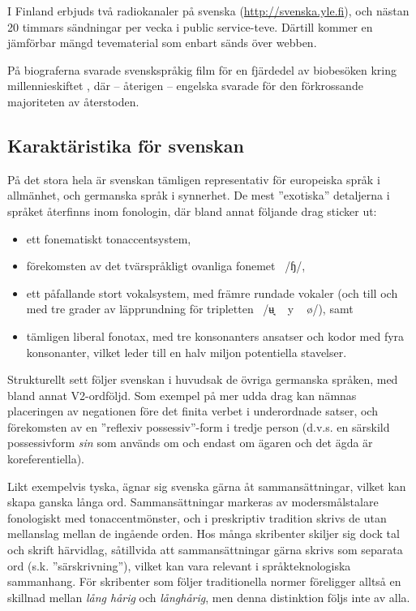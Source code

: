 \begin{multicols}{2}
I Finland erbjuds två radiokanaler på svenska
(\url{http://svenska.yle.fi}), och nästan 20 timmars sändningar per
vecka i public service-teve. Därtill kommer en jämförbar mängd
tevematerial som enbart sänds över webben.

På biograferna svarade svenskspråkig film för en fjärdedel av
biobesöken kring millennieskiftet \cite[85]{falk2001}, där -- återigen
-- engelska svarade för den förkrossande majoriteten av återstoden.


\subsection{Karaktäristika för svenskan}

På det stora hela är svenskan tämligen representativ för europeiska
språk i allmänhet, och germanska språk i synnerhet. De mest ''exotiska''
detaljerna i språket återfinns inom fonologin, där bland annat
följande drag sticker ut:

\begin{itemize}
\item ett fonematiskt tonaccentsystem,
\item förekomsten av det tvärspråkligt ovanliga
  fonemet~{ /ɧ/},
\item ett påfallande stort vokalsystem, med främre rundade vokaler
  (och till och med tre grader av läpprundning för
  tripletten~{ /ʉ̘ ~ y
    ~ ø/}), samt
\item tämligen liberal fonotax, med tre konsonanters ansatser och
  kodor med fyra konsonanter, vilket leder till en halv miljon
  potentiella stavelser.
\end{itemize}

Strukturellt sett följer svenskan i huvudsak de övriga germanska
språken, med bland annat V2-ordföljd. Som exempel på mer udda drag kan
nämnas placeringen av negationen före det finita verbet i underordnade
satser, och förekomsten av en ''reflexiv possessiv''-form i tredje
person (d.v.s. en särskild possessivform \textit{sin} som används om
och endast om ägaren och det ägda är koreferentiella).


Likt exempelvis tyska, ägnar sig svenska gärna åt sammansättningar,
vilket kan skapa ganska långa ord. Sammansättningar markeras av
modersmålstalare fonologiskt med tonaccent­mönster, och i preskriptiv
tradition skrivs de utan mellanslag mellan de ingående orden. Hos
många skribenter skiljer sig dock tal och skrift härvidlag, såtillvida
att sammansättningar gärna skrivs som separata ord
(s.k. ''särskrivning''), vilket kan vara relevant i språkteknologiska
sammanhang. För skribenter som följer traditionella normer föreligger
alltså en skillnad mellan \textit{lång hårig} och \textit{långhårig},
men denna distinktion följs inte av alla.


\end{multicols}
